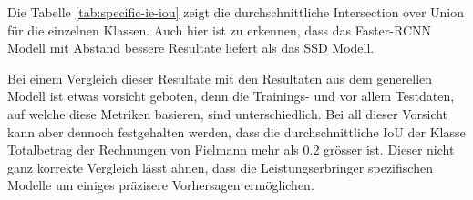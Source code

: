 
Die Tabelle \ref{tab:specific-ie-iou} zeigt die durchschnittliche Intersection over Union für die einzelnen Klassen. Auch hier ist zu erkennen, dass das Faster-RCNN Modell mit Abstand bessere Resultate liefert als das SSD Modell. 

Bei einem Vergleich dieser Resultate mit den Resultaten aus dem generellen Modell ist etwas vorsicht geboten, denn die Trainings- und vor allem Testdaten, auf welche diese Metriken basieren, sind unterschiedlich. Bei all dieser Vorsicht kann aber dennoch festgehalten werden, dass die durchschnittliche IoU der Klasse Totalbetrag der Rechnungen von Fielmann mehr als 0.2 grösser ist. Dieser nicht ganz korrekte Vergleich lässt ahnen, dass die Leistungserbringer spezifischen Modelle um einiges präzisere Vorhersagen ermöglichen.



